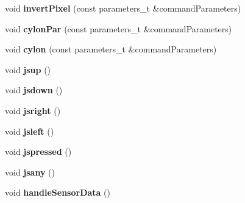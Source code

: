 \begin{DoxyCompactItemize}
\item 
void {\bfseries invert\+Pixel} (const parameters\+\_\+t \&command\+Parameters)\hypertarget{class_m_q_t_tsense_h_a_t_ae5172290839c6af0821f41bae9cf30c7}{}\label{class_m_q_t_tsense_h_a_t_ae5172290839c6af0821f41bae9cf30c7}

\item 
void {\bfseries cylon\+Par} (const parameters\+\_\+t \&command\+Parameters)\hypertarget{class_m_q_t_tsense_h_a_t_a0c2faf77463954149558afc54f965f65}{}\label{class_m_q_t_tsense_h_a_t_a0c2faf77463954149558afc54f965f65}

\item 
void {\bfseries cylon} (const parameters\+\_\+t \&command\+Parameters)\hypertarget{class_m_q_t_tsense_h_a_t_ad70cc61332aefd376e2fafd026e51144}{}\label{class_m_q_t_tsense_h_a_t_ad70cc61332aefd376e2fafd026e51144}

\item 
void {\bfseries jsup} ()\hypertarget{class_m_q_t_tsense_h_a_t_a5d0f57ce2e94813cfa2279d17e4905ae}{}\label{class_m_q_t_tsense_h_a_t_a5d0f57ce2e94813cfa2279d17e4905ae}

\item 
void {\bfseries jsdown} ()\hypertarget{class_m_q_t_tsense_h_a_t_a49af5e2cafdc045b070601e2046ae32c}{}\label{class_m_q_t_tsense_h_a_t_a49af5e2cafdc045b070601e2046ae32c}

\item 
void {\bfseries jsright} ()\hypertarget{class_m_q_t_tsense_h_a_t_a94f4010486bd20e7f1ffd602ab4a6df8}{}\label{class_m_q_t_tsense_h_a_t_a94f4010486bd20e7f1ffd602ab4a6df8}

\item 
void {\bfseries jsleft} ()\hypertarget{class_m_q_t_tsense_h_a_t_ab02c2741dda318559e3f22b85ecd9b28}{}\label{class_m_q_t_tsense_h_a_t_ab02c2741dda318559e3f22b85ecd9b28}

\item 
void {\bfseries jspressed} ()\hypertarget{class_m_q_t_tsense_h_a_t_a4a4c34f1818a47a9e111050cdaf94157}{}\label{class_m_q_t_tsense_h_a_t_a4a4c34f1818a47a9e111050cdaf94157}

\item 
void {\bfseries jsany} ()\hypertarget{class_m_q_t_tsense_h_a_t_ae4e0f972b1ed819bad5954501b8e2597}{}\label{class_m_q_t_tsense_h_a_t_ae4e0f972b1ed819bad5954501b8e2597}

\item 
void {\bfseries handle\+Sensor\+Data} ()\hypertarget{class_m_q_t_tsense_h_a_t_a86bd30bf5003330703c0eca3d29df629}{}\label{class_m_q_t_tsense_h_a_t_a86bd30bf5003330703c0eca3d29df629}


\end{DoxyCompactItemize}
